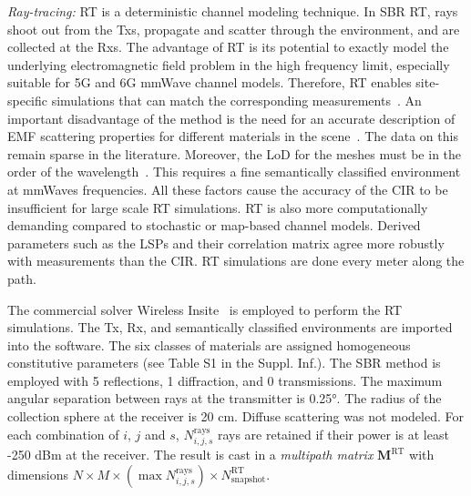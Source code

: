 \documentclass{IEEEtran}
\begin{document}
\textit{Ray-tracing:} \Gls{RT} is a deterministic channel modeling technique. In \gls{SBR} \gls{RT}, rays shoot out from the Txs, propagate and scatter through the environment, and are collected at the Rxs. The advantage of \gls{RT} is its potential to exactly model the underlying electromagnetic field problem in the high frequency limit, especially suitable for 5G and 6G \gls{mmWave} channel models. Therefore, \gls{RT} enables site-specific simulations that can match the corresponding measurements~\cite{RTmatchmeasurement}. An important disadvantage of the method is the need for an accurate description of \gls{EMF} scattering properties for different materials in the scene~\cite{EMparamishard}. The data on this remain sparse in the literature. Moreover, the \gls{LoD} for the meshes must be in the order of the wavelength~\cite{flatnotenough}. This requires a fine semantically classified environment at \glspl{mmWave} frequencies. All these factors cause the accuracy of the \gls{CIR} to be insufficient for large scale \gls{RT} simulations. \gls{RT} is also more computationally demanding compared to stochastic or map-based channel models. Derived parameters such as the \glspl{LSP} and their correlation matrix agree more robustly with measurements than the \gls{CIR}. \gls{RT} simulations are done every meter along the path. 

The commercial solver Wireless Insite~\cite{WI} is employed to perform the \gls{RT} simulations. The Tx, Rx, and semantically classified environments are imported into the software. The six classes of materials are assigned homogeneous constitutive parameters (see Table S1 in the Suppl. Inf.). The \gls{SBR} method is employed with 5 reflections, 1 diffraction, and 0 transmissions. The maximum angular separation between rays at the transmitter is 0.25°. The radius of the collection sphere at the receiver is 20 cm. Diffuse scattering was not modeled. For each combination of $i$, $j$ and $s$, $N^\mathrm{rays}_{i,j,s}$ rays are retained if their power is at least -250 dBm at the receiver. The result is cast in a \textit{multipath matrix} $\mathbf{M}^\mathrm{RT}$ with dimensions $N \times M \times \left( \max N_{i,j,s}^\mathrm{rays} \right) \times N_\mathrm{snapshot}^\mathrm{RT}$.
\end{document}
